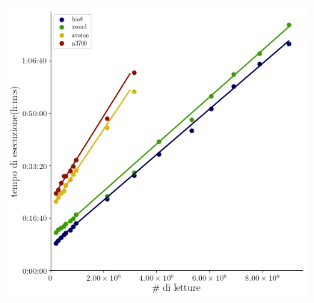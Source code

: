 \documentclass{beamer}
\begin{document}
\begin{frame}
\begin{columns}
\begin{column}{0.8\linewidth}	
\begin{figure}[H]
\centering
\includegraphics[scale=0.43]{Tempi_complessivi.png}
\label{subfig:SP}
\end{figure}
\end{column}
\end{columns}
\end{frame}
\end{document}
